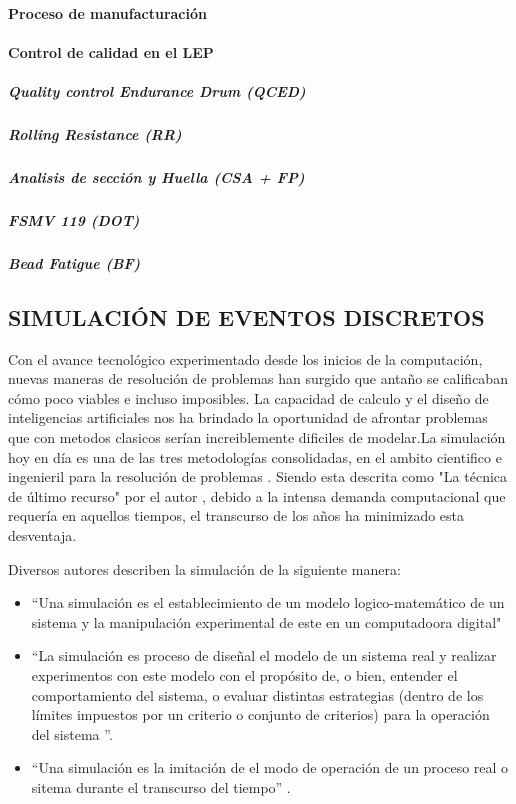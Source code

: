 \paragraph{Proceso de manufacturación}

\paragraph{Control de calidad en el LEP}

\subparagraph{Quality control Endurance Drum (QCED)}

\subparagraph{Rolling Resistance (RR)}

\subparagraph{Analisis de sección y Huella (CSA  + FP)}

\subparagraph{FSMV 119 (DOT)}

\subparagraph{Bead Fatigue (BF)}


\subsection{SIMULACIÓN DE EVENTOS DISCRETOS}
Con el avance tecnológico experimentado desde los inicios de la computación, nuevas maneras de resolución de problemas han surgido que antaño se calificaban cómo poco viables e incluso imposibles. La capacidad de calculo y el diseño de inteligencias artificiales nos ha brindado la oportunidad de afrontar problemas que con metodos clasicos serían increiblemente dificiles de modelar.La simulación hoy en día es una de las tres metodologías consolidadas, en el ambito cientifico e ingenieril para la resolución de problemas \citep{banks1998handbook}. Siendo esta descrita como "La técnica de último recurso" por el autor \citep{garzia1986discrete}, debido a la intensa demanda computacional que requería en aquellos tiempos, el transcurso de los años ha minimizado esta desventaja.

Diversos autores describen la simulación de la siguiente manera:
\begin{itemize}
\item ``Una simulación es el establecimiento de un modelo logico-matemático de un sistema y la manipulación experimental de este en un computadoora digital\citep{pritsker1974gasp}"

\item ``La simulación es proceso de diseñal el modelo de un sistema real y realizar experimentos con este modelo con el propósito de, o bien, entender el comportamiento del sistema, o evaluar distintas estrategias (dentro de los límites impuestos por un criterio o conjunto de criterios) para la operación del sistema \citep{shannon1976systems}''.

\item ``Una simulación es la imitación de el modo de operación de un proceso real o sitema durante el transcurso del tiempo'' \citep{banks1999introduction}.
\end{itemize}


